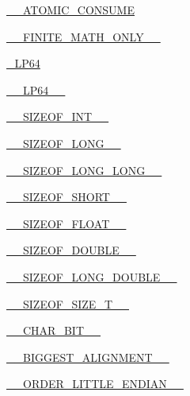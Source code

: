 \begin{DoxyCompactItemize}
\hyperlink{CMakeCache_8txt_a000e85470c6f5d9f1aa22fa4df83f0b9}{\+\_\+\+\_\+\+A\+T\+O\+M\+I\+C\+\_\+\+C\+O\+N\+S\+U\+ME}
\item 
\hyperlink{CMakeCache_8txt_a8af0fd31855c1121674e7d0adf6acbee}{\+\_\+\+\_\+\+F\+I\+N\+I\+T\+E\+\_\+\+M\+A\+T\+H\+\_\+\+O\+N\+L\+Y\+\_\+\+\_\+}
\item 
\hyperlink{CMakeCache_8txt_aae88ee59a31703e88a326390e91a32fd}{\+\_\+\+L\+P64}
\item 
\hyperlink{CMakeCache_8txt_a2dcb516e6c55b8bdfd122dc65ada57b5}{\+\_\+\+\_\+\+L\+P64\+\_\+\+\_\+}
\item 
\hyperlink{CMakeCache_8txt_a52701f18fd19d3d5e1f83ec11c05d570}{\+\_\+\+\_\+\+S\+I\+Z\+E\+O\+F\+\_\+\+I\+N\+T\+\_\+\+\_\+}
\item 
\hyperlink{CMakeCache_8txt_a25b323872510a2d005ee2f45f5efd38b}{\+\_\+\+\_\+\+S\+I\+Z\+E\+O\+F\+\_\+\+L\+O\+N\+G\+\_\+\+\_\+}
\item 
\hyperlink{CMakeCache_8txt_a87bd59f7da0f977c3d450e95b4f00532}{\+\_\+\+\_\+\+S\+I\+Z\+E\+O\+F\+\_\+\+L\+O\+N\+G\+\_\+\+L\+O\+N\+G\+\_\+\+\_\+}
\item 
\hyperlink{CMakeCache_8txt_a13a1a9ce0eb7429c078ea705b54ac44d}{\+\_\+\+\_\+\+S\+I\+Z\+E\+O\+F\+\_\+\+S\+H\+O\+R\+T\+\_\+\+\_\+}
\item 
\hyperlink{CMakeCache_8txt_a99451faa2465beb743c5cadc6a20f102}{\+\_\+\+\_\+\+S\+I\+Z\+E\+O\+F\+\_\+\+F\+L\+O\+A\+T\+\_\+\+\_\+}
\item 
\hyperlink{CMakeCache_8txt_acb4d0f0ad8b370190fb78d60045cbe85}{\+\_\+\+\_\+\+S\+I\+Z\+E\+O\+F\+\_\+\+D\+O\+U\+B\+L\+E\+\_\+\+\_\+}
\item 
\hyperlink{CMakeCache_8txt_a398170fb1a6ec5ddef97aada19630f92}{\+\_\+\+\_\+\+S\+I\+Z\+E\+O\+F\+\_\+\+L\+O\+N\+G\+\_\+\+D\+O\+U\+B\+L\+E\+\_\+\+\_\+}
\item 
\hyperlink{CMakeCache_8txt_a8a0ccc607658039e8f34c766290b880a}{\+\_\+\+\_\+\+S\+I\+Z\+E\+O\+F\+\_\+\+S\+I\+Z\+E\+\_\+\+T\+\_\+\+\_\+}
\item 
\hyperlink{CMakeCache_8txt_af18faf2347e6868d6c9ed02b46326720}{\+\_\+\+\_\+\+C\+H\+A\+R\+\_\+\+B\+I\+T\+\_\+\+\_\+}
\item 
\hyperlink{CMakeCache_8txt_ade3bae6ac3c6cb0079bc5a1a61316c5a}{\+\_\+\+\_\+\+B\+I\+G\+G\+E\+S\+T\+\_\+\+A\+L\+I\+G\+N\+M\+E\+N\+T\+\_\+\+\_\+}
\item 
\hyperlink{CMakeCache_8txt_a668b60d2f5086a7b075f8d739e3a02d5}{\+\_\+\+\_\+\+O\+R\+D\+E\+R\+\_\+\+L\+I\+T\+T\+L\+E\+\_\+\+E\+N\+D\+I\+A\+N\+\_\+\+\_\+}
\item 

\end{DoxyCompactItemize}
